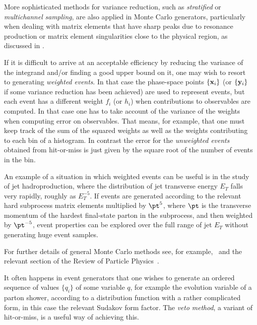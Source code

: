 More sophisticated methods for variance reduction, such as {\it
stratified} or {\it multichannel sampling}, are also applied in Monte
Carlo generators, particularly when dealing with matrix elements that
have sharp peaks due to resonance production or matrix element singularities
close to the physical region, as discussed in .

If it is difficult to arrive at an acceptable efficiency by reducing
the variance of the integrand and/or finding a good upper bound on it,
one may wish to resort to generating {\it weighted events}.  In that
case the phase-space points $\{{\bf x}_i\}$ (or $\{{\bf
y}_i\}$ if some variance reduction has been achieved) are used to
represent events, but each event has a different weight $f_i$ (or
$h_i$) when contributions to observables are computed.  In that case
one has to take account of the variance of the weights when computing
error on observables.  That means, for example, that one must keep track of
the sum of the squared weights as well as the weights contributing to
each bin of a histogram.  In contrast the error for the {\it
unweighted events} obtained from hit-or-miss is just given by the
square root of the number of events in the bin.

An example of a situation in which weighted events can be useful is in the
study of jet hadroproduction, where the distribution of jet transverse
energy $E_T$ falls very rapidly, roughly as $E_T^{-5}$.  If events are
generated according to the relevant hard subprocess matrix elements multiplied
by $\pt^5$, where $\pt$ is the transverse momentum of the hardest
final-state parton in the subprocess, and then weighted by
$\pt^{-5}$, event properties can be explored over the full range of
jet $E_T$ without generating huge event samples.

For further details of general Monte Carlo methods
see, for example,\ \cite{James:1980yn} and the relevant section of the
Review of Particle Physics~\cite{Nakamura:2010zzi}.

\label{mcmethods:veto}
It often happens in event generators that one wishes to generate an
ordered sequence of values $\{q_i\}$ of some variable $q$, for example
the evolution variable of a parton shower, according to a distribution
function with a rather complicated form, in this case the relevant
Sudakov form factor.  The {\it veto method}, a variant of
hit-or-miss, is a useful way of achieving this.

